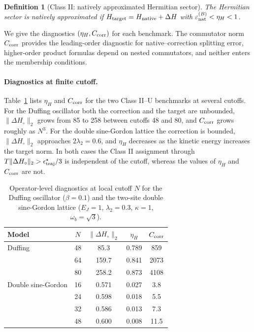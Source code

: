 \documentclass[pra,twocolumn,superscriptaddress,nofootinbib,floatfix]{revtex4-2}
\newtheorem{definition}{Definition}
\theoremstyle{remark}
\begin{document}
\begin{definition}[Class II: natively approximated Hermitian sector]
\label{def:class-II}
The Hermitian sector is \emph{natively approximated} if \(H_{\rm target}=H_{\rm native}+\Delta H\) with \(\varepsilon_{\rm nat}^{(B)}<\eta_H<1\).
\end{definition}

We give the diagnostics \((\eta_H,C_{\rm corr})\) for each benchmark. The commutator norm $C_{\rm corr}$ provides the leading-order diagnostic for native--correction splitting error, higher-order product formulas depend on nested commutators, and neither enters the membership conditions.

\paragraph{Diagnostics at finite cutoff.}
Table~\ref{tab:class-diagnostics} lists \(\eta_H\) and \(C_{\rm corr}\) for the two Class II--U benchmarks at several cutoffs. For the Duffing oscillator both the correction and the target are unbounded, \(\|\Delta H_\circ\|_2\) grows from 85 to 258 between cutoffs 48 and 80, and \(C_{\rm corr}\) grows roughly as \(N^3\). For the double sine-Gordon lattice the correction is bounded, \(\|\Delta H_\circ\|_2\) approaches \(2\lambda_2=0.6\), and \(\eta_H\) decreases as the kinetic energy increases the target norm. In both cases the Class II assignment through \(T\|\Delta H_\circ\|_2>\epsilon^\star_{\rm traj}/3\) is independent of the cutoff, whereas the values of \(\eta_H\) and \(C_{\rm corr}\) are not.

\begin{table}[t]
\caption{Operator-level diagnostics at local cutoff \(N\) for the Duffing oscillator (\(\beta=0.1\)) and the two-site double sine-Gordon lattice (\(E_J=1\), \(\lambda_2=0.3\), \(\kappa=1\), \(\omega_b=\sqrt3\)).}
\label{tab:class-diagnostics}
\begin{ruledtabular}
\begin{tabular}{lcccc}
Model & \(N\) & \(\|\Delta H_\circ\|_2\) & \(\eta_H\) & \(C_{\rm corr}\) \\
\hline
Duffing & 48 & 85.3 & 0.789 & 859 \\
 & 64 & 159.7 & 0.841 & 2073 \\
 & 80 & 258.2 & 0.873 & 4108 \\
Double sine-Gordon & 16 & 0.571 & 0.027 & 3.8 \\
 & 24 & 0.598 & 0.018 & 5.5 \\
 & 32 & 0.586 & 0.013 & 7.3 \\
 & 48 & 0.600 & 0.008 & 11.5 \\
\end{tabular}
\end{ruledtabular}
\end{table}
\end{document}
